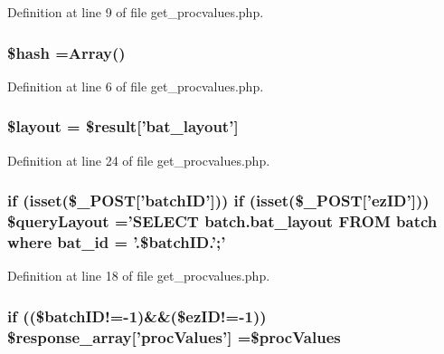 Definition at line 9 of file get\-\_\-procvalues.\-php.

\hypertarget{get__procvalues_8php_ac9fdf6f2c8fb45c1d3bb9a176802b2ad}{
\subsubsection[{\$hash}]{\setlength{\rightskip}{0pt plus 5cm}\$hash =Array()}}\label{get__procvalues_8php_ac9fdf6f2c8fb45c1d3bb9a176802b2ad}


Definition at line 6 of file get\-\_\-procvalues.\-php.

\hypertarget{get__procvalues_8php_a2b0d08e73a90b9443ce37506b7c6a544}{
\subsubsection[{\$layout}]{\setlength{\rightskip}{0pt plus 5cm}\$layout = \$result\mbox{[}'bat\-\_\-layout'\mbox{]}}}\label{get__procvalues_8php_a2b0d08e73a90b9443ce37506b7c6a544}


Definition at line 24 of file get\-\_\-procvalues.\-php.

\hypertarget{get__procvalues_8php_a4a2cac8789c689ec2ffe3ffcc33fa051}{
\subsubsection[{\$query\-Layout}]{\setlength{\rightskip}{0pt plus 5cm}if (isset(\$\-\_\-\-P\-O\-S\-T\mbox{[}'{\bf batch\-I\-D}'\mbox{]})) if (isset(\$\-\_\-\-P\-O\-S\-T\mbox{[}'{\bf ez\-I\-D}'\mbox{]})) \$query\-Layout ='S\-E\-L\-E\-C\-T batch.\-bat\-\_\-layout F\-R\-O\-M batch where bat\-\_\-id = '.\$batch\-I\-D.';'}}\label{get__procvalues_8php_a4a2cac8789c689ec2ffe3ffcc33fa051}


Definition at line 18 of file get\-\_\-procvalues.\-php.

\hypertarget{get__procvalues_8php_ac730010bbce5fa8ff863cc0faea91cf7}{
\subsubsection[{\$response\-\_\-array}]{\setlength{\rightskip}{0pt plus 5cm}if ((\$batch\-I\-D!=-\/1)\&\&(\$ez\-I\-D!=-\/1)) \$response\-\_\-array\mbox{[}'proc\-Values'\mbox{]} =\$proc\-Values}}\label{get__procvalues_8php_ac730010bbce5fa8ff863cc0faea91cf7}


